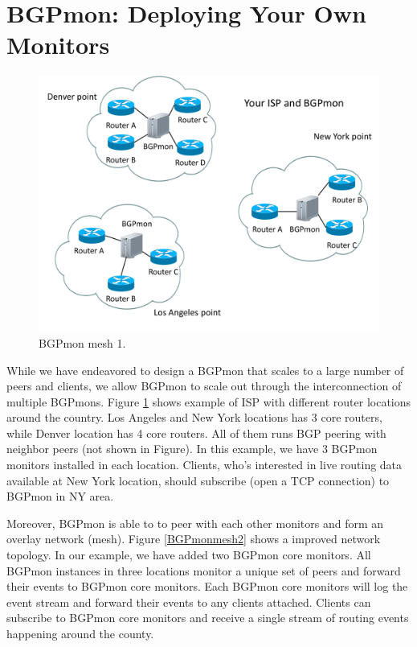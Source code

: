 \section{BGPmon: Deploying Your Own Monitors}
\label{sec:mesh}

\begin{figure}
\centering
\includegraphics[scale=0.30]{figs/your-isp-and-bgpmon1.pdf}
\caption{BGPmon mesh 1.}
\label{BGPmonmesh1}
\end{figure}




While we have endeavored to design a BGPmon that scales to a large number of peers and clients, we allow BGPmon to scale out through the interconnection of multiple BGPmons. Figure \ref{BGPmonmesh1} shows example of ISP with different router locations around the country. Los Angeles and New York locations has 3 core routers, while Denver location has 4 core routers. All of them runs BGP peering with neighbor peers (not shown in Figure). In this example, we have 3 BGPmon monitors installed in each location. Clients, who's interested in live routing data available at New York location, should subscribe (open a TCP connection) to BGPmon in NY area. 



Moreover, BGPmon is able to to peer with each other monitors and form an overlay network (mesh). Figure \ref{BGPmonmesh2} shows a improved network topology. In our example, we have added two BGPmon core monitors. All BGPmon instances in three locations monitor a unique set of peers and forward their events to BGPmon core monitors.  Each BGPmon core monitors will log the event stream and forward their events to any clients attached. Clients can subscribe to BGPmon core monitors and receive a single stream of routing events happening around the county. 

